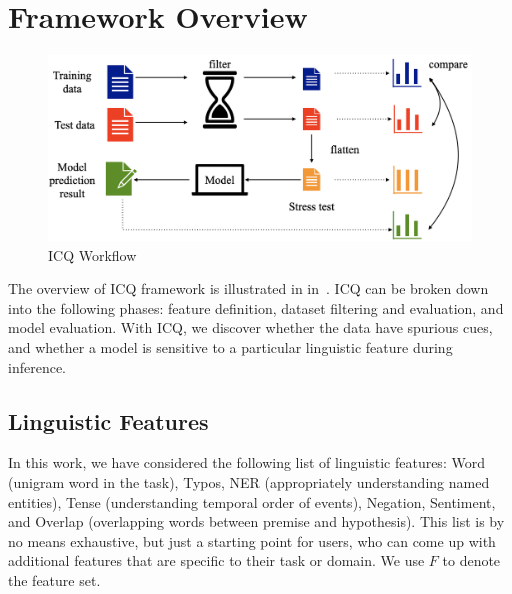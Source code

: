 \section{Framework Overview}
\label{sec:system}

\begin{figure}[th]
\centering
\includegraphics[width=1.0\columnwidth]{picture/framework.jpg}
\caption{ICQ Workflow}
\label{fig:framework}
\end{figure}

The overview of ICQ framework is illustrated in in~.
ICQ can be broken down into the following phases: feature definition, 
dataset filtering and evaluation, and model evaluation. With ICQ, we 
discover whether the data have spurious cues, and whether a model is 
sensitive to a particular linguistic feature during inference.


\subsection{Linguistic Features}
\label{sec:extract}

In this work, we have considered the following list of linguistic features: 
Word (unigram word in the task), 
Typos, NER (appropriately understanding named entities), 
Tense (understanding temporal order of events), Negation, 
Sentiment, and Overlap (overlapping words between premise and hypothesis). 
This list is by no means exhaustive, but just a starting point for users, 
who can come up with additional features that are specific 
to their task or domain. We use $F$ to denote the feature set.

